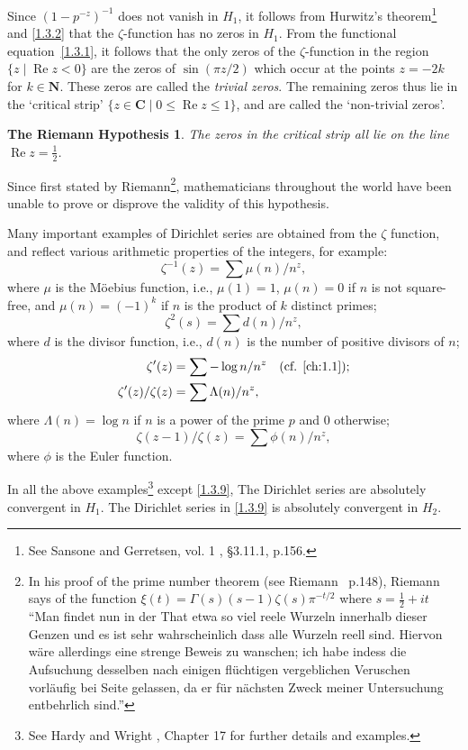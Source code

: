 \documentclass[10pt]{article}
\newtheorem{rh}[theo]{The Riemann Hypothesis}
\theoremstyle{definition}
\def\NN{\mathbf{N}}
\def\CC{\mathbf{C}}
\DeclareMathOperator{\re}{Re}
\def\qw#1{`#1'}
\def\fnonze{See Sansone and Gerretsen, vol. 1 \cite{bib:162}, \S3.11.1, p.156.}
\def\fnonon{In his proof of the prime number theorem (see Riemann~\cite{bib:155} p.148), Riemann says of the function $\xi(t) = \Gamma(s) (s-1) \zeta(s) \pi^{-t/2}$ where $s = \frac12 + it$ ``Man findet nun in der That etwa so viel reele Wurzeln innerhalb dieser Genzen und es ist sehr wahrscheinlich dass alle Wurzeln reell sind. Hiervon w\"are allerdings eine strenge Beweis zu wanschen; ich habe indess die Aufsuchung desselben nach einigen fl\"uchtigen vergeblichen Veruschen vorl\"aufig bei Seite gelassen, da er f\"ur n\"achsten Zweck meiner Untersuchung entbehrlich sind.''}
\def\fnontw{See Hardy and Wright \cite{bib:86}, Chapter 17 for further details and examples.}
\begin{document}
Since $(1-p^{-z})^{-1}$ does not vanish in $H_1$, it follows from Hurwitz's theorem\footnote{\fnonze} and \ref{1.3.2} that the $\zeta$-function has no zeros in $H_1$.
From the functional equation~\eqref{1.3.1}, it follows that the only zeros of the $\zeta$-function in the region $\{ z \mid \re z < 0 \}$ are the zeros of $\sin(\pi z / 2)$ which occur at the points $z = -2k$ for $k \in \NN$.
These zeros are called the \emph{trivial zeros}.
The remaining zeros thus lie in the \qw{critical strip} $\{z \in \CC \mid 0 \leq \re z \leq 1 \}$, and are called the \qw{non-trivial zeros}.


\begin{rh}
\label{1.3.4}
The zeros in the critical strip all lie on the line $\re z = \frac12$.
\end{rh}


Since first stated by Riemann\footnote{\fnonon}, mathematicians throughout the world have been unable to prove or disprove the validity of this hypothesis.

Many important examples of Dirichlet series are obtained from the $\zeta$ function, and reflect various arithmetic properties of the integers, for example:
\begin{equation}
\label{1.3.5}
\zeta^{-1}(z) = \sum \mu(n) / n^z,
\end{equation}
where $\mu$ is the M\"oebius function, i.e., $\mu(1) = 1$, $\mu(n) = 0$ if $n$ is not square-free, and $\mu(n) = (-1)^k$ if $n$ is the product of $k$ distinct primes;
\begin{equation}
\label{1.3.6}
\zeta^2(s) = \sum d(n) / n^z,
\end{equation}
where $d$ is the divisor function, i.e., $d(n)$ is the number of positive divisors of $n$;
\begin{align}
\label{1.3.7}
\zeta'(z) &= \sum -\log n / n^z
\quad\text{(cf. \ref{ch:1.1})};
\\
\label{1.3.8}
\zeta'(z) / \zeta(z) &= \sum \Lambda(n) / n^z,
\end{align}
where $\Lambda(n) = \log n$ if $n$ is a power of the prime $p$ and $0$ otherwise;
\begin{equation}
\label{1.3.9}
\zeta(z-1)/\zeta(z) = \sum \phi(n) / n^z,
\end{equation}
where $\phi$ is the Euler function.

In all the above examples\footnote{\fnontw} except \eqref{1.3.9}, The Dirichlet series are absolutely convergent in $H_1$.
The Dirichlet series in \eqref{1.3.9} is absolutely convergent in $H_2$.
\end{document}
